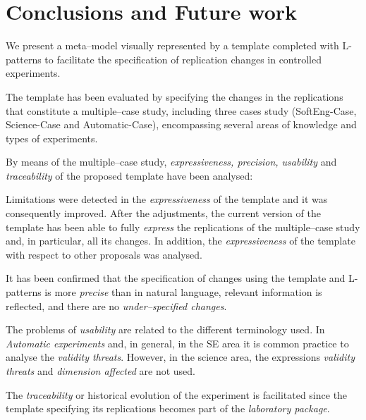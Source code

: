 
\section{Conclusions and Future work}
\label{sec:conclusions}

We present a meta--model visually represented by a template completed with L-patterns to facilitate the specification of replication changes in controlled experiments. 

The template has been evaluated by specifying the changes in the replications that constitute a multiple--case study, including three cases study (SoftEng-Case, Science-Case and Automatic-Case), encompassing several areas of knowledge and types of experiments.

By means of the multiple--case study, \emph{expressiveness, precision, usability} and \emph{traceability} of the proposed template have been analysed:

Limitations were detected in the \emph{expressiveness} of the template and it was consequently improved. %
After the adjustments, the current version of the template has been able to fully \emph{express} the replications of the multiple--case study and, in particular, all its changes. %
In addition, the \emph{expressiveness} of the template  with respect to other proposals was analysed.

It has been confirmed that the specification of changes using the template and L-patterns is more \emph{precise} than in natural language, relevant information is reflected, and there are no \emph{under--specified changes}.

The problems of \emph{usability} are related to the different terminology used. In \emph{Automatic experiments} and, in general, in the \gls{SE} area it is common practice to analyse the \emph{validity threats}. However, in the science area, the expressions \emph{validity threats} and \emph{dimension affected} are not used. 

The \emph{traceability} or historical evolution of the experiment is facilitated since the template specifying its replications becomes part of the \emph{laboratory package}.

